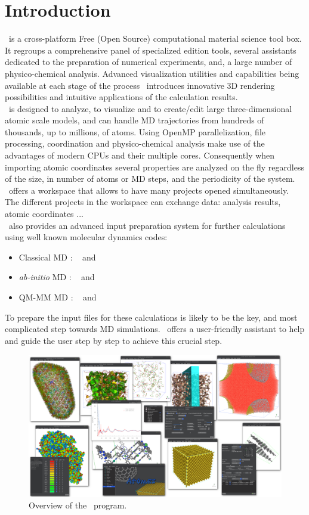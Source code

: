 \chapter{Introduction}

\atomes\ is a cross-platform Free (Open Source) computational material science tool box. 
It regroups a comprehensive panel of specialized edition tools, several assistants dedicated to the preparation of numerical experiments, 
and, a large number of physico-chemical analysis. 
Advanced visualization utilities and capabilities being available at each stage of the process \atomes\ 
introduces innovative 3D rendering possibilities and intuitive applications of the calculation results. \\[0.25cm]
\atomes\ is designed to analyze, to visualize and to create/edit large three-dimensional atomic scale models, 
and can handle MD trajectories from hundreds of thousands, up to millions, of atoms. 
Using OpenMP parallelization, file processing, coordination and physico-chemical analysis 
make use of the advantages of modern CPUs and their multiple cores. 
Consequently when importing atomic coordinates several properties are analyzed on the fly regardless of the size, 
in number of atoms or MD steps, and the periodicity of the system. \\
\atomes\ offers a workspace that allows to have many projects opened simultaneously. 
The different projects in the workspace can exchange data: analysis results, atomic coordinates ... \\[0.25cm]
\atomes\ also provides an advanced input preparation system for further calculations using well known molecular dynamics codes: 
\begin{itemize}
\item Classical MD : \dlpoly\ \cite{DLPOLY} and \lammps\ \cite{LAMMPS}
\item {\em{ab-initio}} MD : \cpmd\ \cite{CPMD} and \cptk\ \cite{CP2K}
\item QM-MM MD : \cpmd\ \cite{CPMD} and \cptk\ \cite{CP2K}
\end{itemize}
\noindent To prepare the input files for these calculations is likely to be the key, and most complicated step towards MD simulations. 
\atomes\ offers a user-friendly assistant to help and guide the user step by step to achieve this crucial step. 
\begin{figure}[!p]
\hypertarget{overview}{
\begin{center}
\includegraphics*[width=23cm, angle=90, keepaspectratio=true, draft=\ddst]{img/overview4}
\end{center}
\caption{Overview of the \atomes\ program.}\label{overview}
}
\end{figure}

